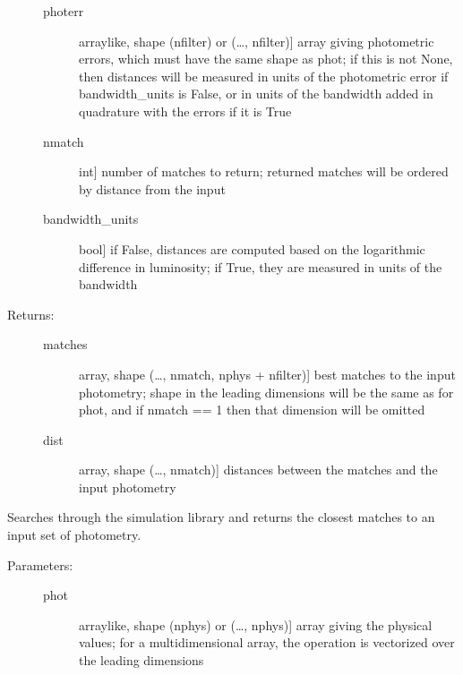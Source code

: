 \documentclass[letterpaper,10pt,english]{sphinxmanual}
\begin{document}
\begin{fulllineitems}
\begin{fulllineitems}
\begin{description}
\begin{description}
\item[{photerr}] \leavevmode{[}arraylike, shape (nfilter) or (…, nfilter){]}
array giving photometric errors, which must have the
same shape as phot; if this is not None,
then distances will be measured in units of the
photometric error if bandwidth\_units is False, or in
units of the bandwidth added in quadrature with the
errors if it is True

\item[{nmatch}] \leavevmode{[}int{]}
number of matches to return; returned matches will be
ordered by distance from the input

\item[{bandwidth\_units}] \leavevmode{[}bool{]}
if False, distances are computed based on the
logarithmic difference in luminosity; if True, they are
measured in units of the bandwidth

\end{description}

\item[{Returns:}] \leavevmode\begin{description}
\item[{matches}] \leavevmode{[}array, shape (…, nmatch, nphys + nfilter){]}
best matches to the input photometry; shape in the
leading dimensions will be the same as for phot, and if
nmatch == 1 then that dimension will be omitted

\item[{dist}] \leavevmode{[}array, shape (…, nmatch){]}
distances between the matches and the input photometry

\end{description}

\end{description}

\end{fulllineitems}


\begin{fulllineitems}
\label{\detokenize{bayesphot:slugpy.bayesphot.bp.bp.bestmatch_phys}}
Searches through the simulation library and returns the closest
matches to an input set of photometry.
\begin{description}
\item[{Parameters:}] \leavevmode\begin{description}
\item[{phot}] \leavevmode{[}arraylike, shape (nphys) or (…, nphys){]}
array giving the physical values; for a
multidimensional array, the operation is vectorized over
the leading dimensions


\end{description}
\end{description}
\end{fulllineitems}
\end{fulllineitems}
\end{document}
